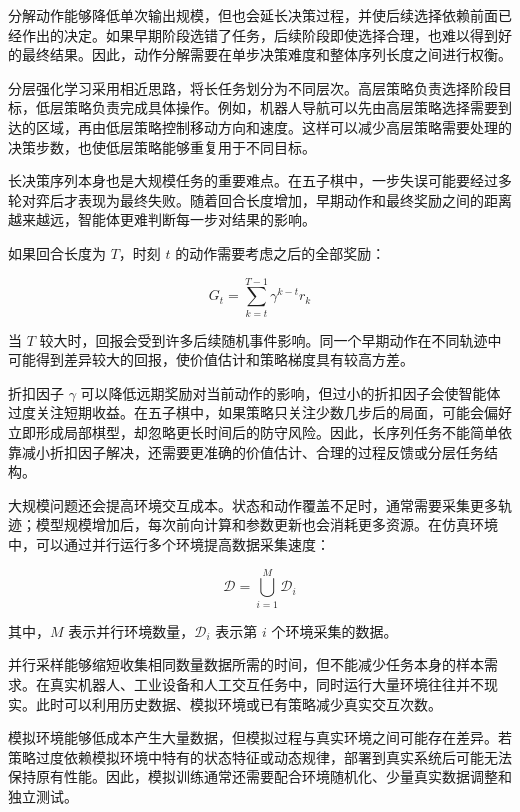 分解动作能够降低单次输出规模，但也会延长决策过程，并使后续选择依赖前面已经作出的决定。如果早期阶段选错了任务，后续阶段即使选择合理，也难以得到好的最终结果。因此，动作分解需要在单步决策难度和整体序列长度之间进行权衡。

分层强化学习采用相近思路，将长任务划分为不同层次。高层策略负责选择阶段目标，低层策略负责完成具体操作。例如，机器人导航可以先由高层策略选择需要到达的区域，再由低层策略控制移动方向和速度。这样可以减少高层策略需要处理的决策步数，也使低层策略能够重复用于不同目标。

长决策序列本身也是大规模任务的重要难点。在五子棋中，一步失误可能要经过多轮对弈后才表现为最终失败。随着回合长度增加，早期动作和最终奖励之间的距离越来越远，智能体更难判断每一步对结果的影响。

如果回合长度为 $T$，时刻 $t$ 的动作需要考虑之后的全部奖励：

\begin{equation}
G_t
=
\sum_{k=t}^{T-1}
\gamma^{k-t}r_k
\end{equation}

当 $T$ 较大时，回报会受到许多后续随机事件影响。同一个早期动作在不同轨迹中可能得到差异较大的回报，使价值估计和策略梯度具有较高方差。

折扣因子 $\gamma$ 可以降低远期奖励对当前动作的影响，但过小的折扣因子会使智能体过度关注短期收益。在五子棋中，如果策略只关注少数几步后的局面，可能会偏好立即形成局部棋型，却忽略更长时间后的防守风险。因此，长序列任务不能简单依靠减小折扣因子解决，还需要更准确的价值估计、合理的过程反馈或分层任务结构。

大规模问题还会提高环境交互成本。状态和动作覆盖不足时，通常需要采集更多轨迹；模型规模增加后，每次前向计算和参数更新也会消耗更多资源。在仿真环境中，可以通过并行运行多个环境提高数据采集速度：

\begin{equation}
\mathcal{D}
=
\bigcup_{i=1}^{M}
\mathcal{D}_i
\end{equation}

其中，$M$ 表示并行环境数量，$\mathcal{D}_i$ 表示第 $i$ 个环境采集的数据。

并行采样能够缩短收集相同数量数据所需的时间，但不能减少任务本身的样本需求。在真实机器人、工业设备和人工交互任务中，同时运行大量环境往往并不现实。此时可以利用历史数据、模拟环境或已有策略减少真实交互次数。

模拟环境能够低成本产生大量数据，但模拟过程与真实环境之间可能存在差异。若策略过度依赖模拟环境中特有的状态特征或动态规律，部署到真实系统后可能无法保持原有性能。因此，模拟训练通常还需要配合环境随机化、少量真实数据调整和独立测试。

